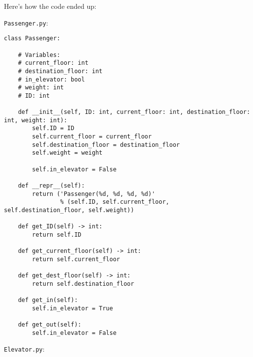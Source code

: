 \documentclass{article}
\begin{document}
Here's how the code ended up:

\newpage
\noindent \texttt{Passenger.py}:

\begin{verbatim}
class Passenger:

    # Variables:
    # current_floor: int
    # destination_floor: int
    # in_elevator: bool
    # weight: int
    # ID: int

    def __init__(self, ID: int, current_floor: int, destination_floor: int, weight: int):
        self.ID = ID
        self.current_floor = current_floor
        self.destination_floor = destination_floor
        self.weight = weight

        self.in_elevator = False

    def __repr__(self):
        return ('Passenger(%d, %d, %d, %d)'
                % (self.ID, self.current_floor, self.destination_floor, self.weight))

    def get_ID(self) -> int:
        return self.ID

    def get_current_floor(self) -> int:
        return self.current_floor

    def get_dest_floor(self) -> int:
        return self.destination_floor

    def get_in(self):
        self.in_elevator = True

    def get_out(self):
        self.in_elevator = False
\end{verbatim}

\newpage
\noindent \texttt{Elevator.py}:
\end{document}
